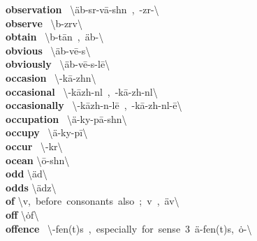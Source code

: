 \documentclass[10pt,a4paper]{article}
\begin{document}
\begin{multicols}{2}
\textbf{ observation }\quad \ \textbackslash \textsecstress \"{a}b-s\textschwa r-\textprimstress v\={a}-sh\textschwa n\ ,\ -z\textschwa r-\textbackslash \\
\textbf{ observe }\quad \ \textbackslash \textschwa b-\textprimstress z\textschwa rv\textbackslash \\
\textbf{ obtain }\quad \ \textbackslash \textschwa b-\textprimstress t\={a}n\ ,\ \"{a}b-\textbackslash \\
\textbf{ obvious }\quad \ \textbackslash \textprimstress \"{a}b-v\={e}-\textschwa s\textbackslash \\
\textbf{ obviously }\quad \ \textbackslash \textprimstress \"{a}b-v\={e}-\textschwa s-l\={e}\textbackslash \\
\textbf{ occasion }\quad \ \textbackslash \textschwa -\textprimstress k\={a}-zh\textschwa n\textbackslash \\
\textbf{ occasional }\quad \ \textbackslash \textschwa -\textprimstress k\={a}zh-n\textschwa l\ ,\ -\textprimstress k\={a}-zh\textschwa -n\textsuperscript{\textreve}l\textbackslash \\
\textbf{ occasionally }\quad \ \textbackslash \textschwa -\textprimstress k\={a}zh-n\textschwa -l\={e}\ ,\ -\textprimstress k\={a}-zh\textschwa -n\textsuperscript{\textreve}l-\={e}\textbackslash \\
\textbf{ occupation }\quad \ \textbackslash \textsecstress \"{a}-ky\textschwa -\textprimstress p\={a}-sh\textschwa n\textbackslash \\
\textbf{ occupy }\quad \ \textbackslash \textprimstress \"{a}-ky\textschwa -\textsecstress p\={i}\textbackslash \\
\textbf{ occur }\quad \ \textbackslash \textschwa -\textprimstress k\textschwa r\textbackslash \\
\textbf{ ocean }\quad \textbackslash \textprimstress \={o}-sh\textschwa n\textbackslash \\
\textbf{ odd }\quad \textbackslash \textprimstress \"{a}d\textbackslash \\
\textbf{ odds }\quad \textbackslash \textprimstress \"{a}dz\textbackslash \\
\textbf{ of }\quad \textbackslash \textschwa v,\ before\ consonants\ also\ \textschwa ;\ \textprimstress \textschwa v\ ,\ \textprimstress \"{a}v\textbackslash \\
\textbf{ off }\quad \textbackslash \textprimstress \.{o}f\textbackslash \\
\textbf{ offence }\quad \ \textbackslash \textschwa -\textprimstress fen(t)s\ ,\ especially\ for\ sense\ 3\ \textprimstress \"{a}-\textsecstress fen(t)s,\ \textprimstress \.{o}-\textbackslash \\

\end{multicols}
\end{document}
